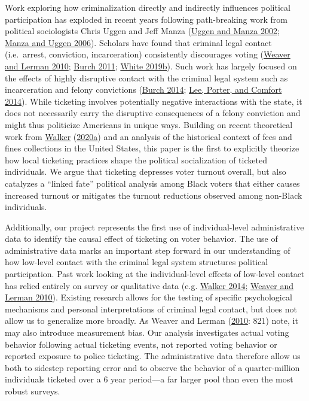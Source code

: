 \documentclass[
  12pt,
]{article}
\begin{document}
Work exploring how criminalization directly and indirectly influences political participation has exploded in recent years following path-breaking work from political sociologists Chris Uggen and Jeff Manza (\protect\hyperlink{ref-Uggen2002}{Uggen and Manza 2002}; \protect\hyperlink{ref-Manza2006}{Manza and Uggen 2006}). Scholars have found that criminal legal contact (i.e.~arrest, conviction, incarceration) consistently discourages voting (\protect\hyperlink{ref-Weaver2010}{Weaver and Lerman 2010}; \protect\hyperlink{ref-Burch2011}{Burch 2011}; \protect\hyperlink{ref-White2019a}{White 2019b}). Such work has largely focused on the effects of highly disruptive contact with the criminal legal system such as incarceration and felony convictions (\protect\hyperlink{ref-Burch2014}{Burch 2014}; \protect\hyperlink{ref-Lee2014}{Lee, Porter, and Comfort 2014}). While ticketing involves potentially negative interactions with the state, it does not necessarily carry the disruptive consequences of a felony conviction and might thus politicize Americans in unique ways. Building on recent theoretical work from \protect\hyperlink{ref-Walker2020a}{Walker} (\protect\hyperlink{ref-Walker2020a}{2020a}) and an analysis of the historical context of fees and fines collections in the United States, this paper is the first to explicitly theorize how local ticketing practices shape the political socialization of ticketed individuals. We argue that ticketing depresses voter turnout overall, but also catalyzes a ``linked fate'' political analysis among Black voters that either causes increased turnout or mitigates the turnout reductions observed among non-Black individuals.

Additionally, our project represents the first use of individual-level administrative data to identify the causal effect of ticketing on voter behavior. The use of administrative data marks an important step forward in our understanding of how low-level contact with the criminal legal system structures political participation. Past work looking at the individual-level effects of low-level contact has relied entirely on survey or qualitative data (e.g. \protect\hyperlink{ref-Walker2014}{Walker 2014}; \protect\hyperlink{ref-Weaver2010}{Weaver and Lerman 2010}). Existing research allows for the testing of specific psychological mechanisms and personal interpretations of criminal legal contact, but does not allow us to generalize more broadly. As Weaver and Lerman (\protect\hyperlink{ref-Weaver2010}{2010}: 821) note, it may also introduce measurement bias. Our analysis investigates actual voting behavior following actual ticketing events, not reported voting behavior or reported exposure to police ticketing. The administrative data therefore allow us both to sidestep reporting error and to observe the behavior of a quarter-million individuals ticketed over a 6 year period---a far larger pool than even the most robust surveys.
\end{document}
